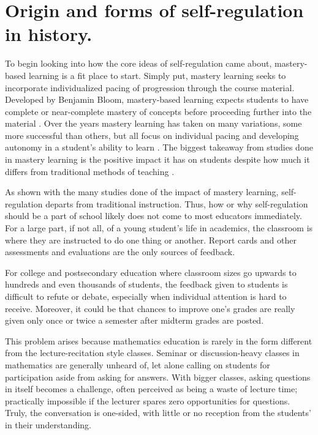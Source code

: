 \section{Origin and forms of self-regulation in history.}

To begin looking into how the core ideas of self-regulation came about, mastery-based learning is a fit place to start. Simply put, mastery learning seeks to incorporate individualized pacing of progression through the course material. Developed by Benjamin Bloom, mastery-based learning expects students to have complete or near-complete mastery of concepts before proceeding further into the material \citep{bloom_learning_1968}. Over the years mastery learning has taken on many variations, some more successful than others, but all focus on individual pacing and developing autonomy in a student's ability to learn \citep{bradley_evaluating_2017}. The biggest takeaway from studies done in mastery learning is the positive impact it has on students despite how much it differs from traditional methods of teaching \citep{zollinger_impact_2017}.

As shown with the many studies done of the impact of mastery learning, self-regulation departs from traditional instruction. Thus, how or why self-regulation should be a part of school likely does not come to most educators immediately. For a large part, if not all, of a young student's life in academics, the classroom is where they are instructed to do one thing or another. Report cards and other assessments and evaluations are the only sources of feedback.

For college and postsecondary education where classroom sizes go upwards to hundreds and even thousands of students, the feedback given to students is difficult to refute or debate, especially when individual attention is hard to receive. Moreover, it could be that chances to improve one's grades are really given only once or twice a semester after midterm grades are posted.

This problem arises because mathematics education is rarely in the form different from the lecture-recitation style classes. Seminar or discussion-heavy classes in mathematics are generally unheard of, let alone calling on students for participation aside from asking for answers. With bigger classes, asking questions in itself becomes a challenge, often perceived as being a waste of lecture time; practically impossible if the lecturer spares zero opportunities for questions. Truly, the conversation is one-sided, with little or no reception from the students' in their understanding.


